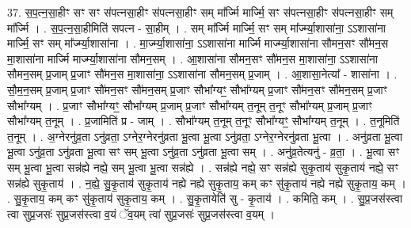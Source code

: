 \documentclass[17pt]{extarticle}
\begin{document}
37. स॒प॒त्न॒सा॒हीꣳ सꣳ सꣳ स॑पत्नसा॒हीꣳ स॑पत्नसा॒हीꣳ सम् मा᳚र्ज्मि मार्ज्मि॒ सꣳ स॑पत्नसा॒हीꣳ स॑पत्नसा॒हीꣳ सम् मा᳚र्ज्मि । . स॒प॒त्न॒सा॒हीमिति॑ सपत्न - सा॒हीम् । . सम् मा᳚र्ज्मि मार्ज्मि॒ सꣳ सम् मा᳚र्ज्म्या॒शासा॑ना॒ ऽऽशासा॑ना मार्ज्मि॒ सꣳ सम् मा᳚र्ज्म्या॒शासा॑ना । . मा॒र्ज्म्या॒शासा॑ना॒ ऽऽशासा॑ना मार्ज्मि मार्ज्म्या॒शासा॑ना सौमन॒सꣳ सौ॑मन॒स मा॒शासा॑ना मार्ज्मि मार्ज्म्या॒शासा॑ना सौमन॒सम् । . आ॒शासा॑ना सौमन॒सꣳ सौ॑मन॒स मा॒शासा॑ना॒ ऽऽशासा॑ना सौमन॒सम् प्र॒जाम् प्र॒जाꣳ सौ॑मन॒स मा॒शासा॑ना॒ ऽऽशासा॑ना सौमन॒सम् प्र॒जाम् । . आ॒शासा॒नेत्या᳚ - शासा॑ना । . सौ॒म॒न॒सम् प्र॒जाम् प्र॒जाꣳ सौ॑मन॒सꣳ सौ॑मन॒सम् प्र॒जाꣳ सौभा᳚ग्यꣳ॒॒ सौभा᳚ग्यम् प्र॒जाꣳ सौ॑मन॒सꣳ सौ॑मन॒सम् प्र॒जाꣳ सौभा᳚ग्यम् । . प्र॒जाꣳ सौभा᳚ग्यꣳ॒॒ सौभा᳚ग्यम् प्र॒जाम् प्र॒जाꣳ सौभा᳚ग्यम् त॒नूम् त॒नूꣳ सौभा᳚ग्यम् प्र॒जाम् प्र॒जाꣳ सौभा᳚ग्यम् त॒नूम् । . प्र॒जामिति॑ प्र - जाम् । . सौभा᳚ग्यम् त॒नूम् त॒नूꣳ सौभा᳚ग्यꣳ॒॒ सौभा᳚ग्यम् त॒नूम् । . त॒नूमिति॑ त॒नूम् । . अ॒ग्नेरनु॑व्र॒ता ऽनु॑व्रता॒ ऽग्नेर॒ग्नेरनु॑व्रता भू॒त्वा भू॒त्वा ऽनु॑व्रता॒ ऽग्नेर॒ग्नेरनु॑व्रता भू॒त्वा । . अनु॑व्रता भू॒त्वा भू॒त्वा ऽनु॑व्र॒ता ऽनु॑व्रता भू॒त्वा सꣳ सम् भू॒त्वा ऽनु॑व्र॒ता ऽनु॑व्रता भू॒त्वा सम् । . अनु॑व्र॒तेत्यनु॑ - व्र॒ता॒ । . भू॒त्वा सꣳ सम् भू॒त्वा भू॒त्वा सन्न॑ह्ये नह्ये॒ सम् भू॒त्वा भू॒त्वा सन्न॑ह्ये । . सन्न॑ह्ये नह्ये॒ सꣳ सन्न॑ह्ये सुकृ॒ताय॑ सुकृ॒ताय॑ नह्ये॒ सꣳ सन्न॑ह्ये सुकृ॒ताय॑ । . न॒ह्ये॒ सु॒कृ॒ताय॑ सुकृ॒ताय॑ नह्ये नह्ये सुकृ॒ताय॒ कम् कꣳ सु॑कृ॒ताय॑ नह्ये नह्ये सुकृ॒ताय॒ कम् । . सु॒कृ॒ताय॒ कम् कꣳ सु॑कृ॒ताय॑ सुकृ॒ताय॒ कम् । . सु॒कृ॒तायेति॑ सु - कृ॒ताय॑ । . कमिति॒ कम् । . सु॒प्र॒जस॑स्त्वा त्वा सुप्र॒जसः॑ सुप्र॒जस॑स्त्वा व॒यं ॅव॒यम् त्वा॑ सुप्र॒जसः॑ सुप्र॒जस॑स्त्वा व॒यम् । \newline
\end{document}
